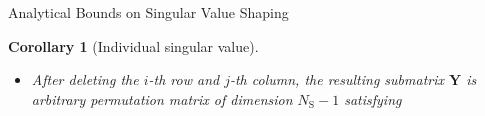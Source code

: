 \documentclass[journal]{IEEEtran}
\newtheorem{corollary}{Corollary}[proposition]
\begin{document}
\begin{section}{Analytical Bounds on Singular Value Shaping}
\begin{corollary}[Individual singular value\label{co:sv_nth}]
\begin{itemize}
				\begin{subnumcases}{(i, j) =}
					 \sigma_i(_) \sigma_j(_) & for $\mathbf{P}$, \label{eq:sv_nth_max_pair} \\
					 \sigma_i(_) \sigma_j(_) & for $\mathbf{Q}$, \label{eq:sv_nth_min_pair}
				\end{subnumcases}
				and ties may be broken arbitrarily;
				\item After deleting the $i$-th row and $j$-th column, the resulting submatrix $\mathbf{Y}$ is arbitrary permutation matrix of dimension $N_\mathrm{S}-1$ satisfying


\end{itemize}
\end{corollary}
\end{section}
\end{document}

